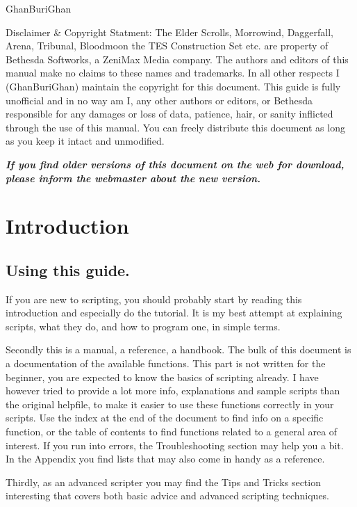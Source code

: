 \documentclass[oneside]{article}
\begin{document}
GhanBuriGhan

Disclaimer \& Copyright Statment: The Elder Scrolls, Morrowind, Daggerfall, Arena, Tribunal, Bloodmoon the TES Construction Set etc. are property of Bethesda Softworks, a ZeniMax Media company. The authors and editors of this manual make no claims to these names and trademarks. In all other respects I (GhanBuriGhan) maintain the copyright for this document. This guide is fully unofficial and in no way am I, any other authors or editors, or Bethesda responsible for any damages or loss of data, patience, hair, or sanity inflicted through the use of this manual. You can freely distribute this document as long as you keep it intact and unmodified.

\emph{\textbf{If you find older versions of this document on the web for
download, please inform the webmaster about the new version.}}


\section{Introduction}

\hypertarget{using-this-guide.}{%
\subsection{Using this guide.}\label{using-this-guide.}}

If you are new to scripting, you should probably start by reading this introduction and especially do the tutorial. It is my best attempt at explaining scripts, what they do, and how to program one, in simple terms.

Secondly this is a manual, a reference, a handbook. The bulk of this document is a documentation of the available functions. This part is not written for the beginner, you are expected to know the basics of scripting already. I have however tried to provide a lot more info, explanations and sample scripts than the original helpfile, to make it easier to use these functions correctly in your scripts. Use the index at the end of the document to find info on a specific function, or the table of contents to find functions related to a general area of
interest. If you run into errors, the Troubleshooting section may help you a bit. In the Appendix you find lists that may also come in handy as a reference.

Thirdly, as an advanced scripter you may find the Tips and Tricks section interesting that covers both basic advice and advanced scripting techniques.
\end{document}
